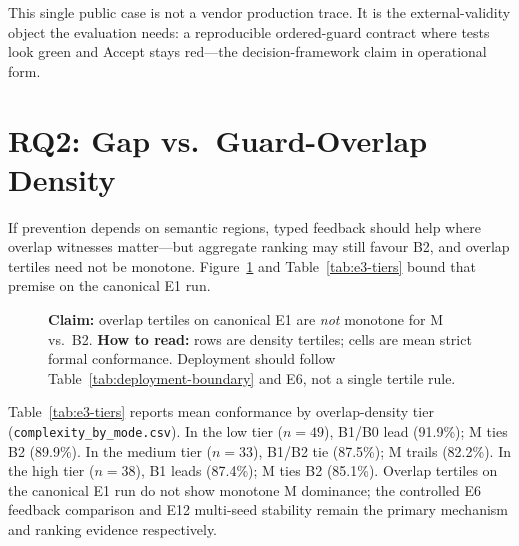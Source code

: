 This single public case is not a vendor production trace.
It is the external-validity object the evaluation needs: a reproducible
ordered-guard contract where tests look green and Accept stays red---the
decision-framework claim in operational form.



\section{RQ2: Gap vs.\ Guard-Overlap Density}
\label{sec:results:rq2}

If prevention depends on semantic regions, typed feedback should help where
overlap witnesses matter---but aggregate ranking may still favour B2, and
overlap tertiles need not be monotone.
Figure~\ref{fig:complexity} and Table~\ref{tab:e3-tiers} bound that premise
on the canonical E1 run.

\begin{figure}[t]
  \centering
  \caption{\textbf{Claim:} overlap tertiles on canonical E1 are \emph{not} monotone
    for M vs.\ B2.
    \textbf{How to read:} rows are density tertiles; cells are mean strict
    formal conformance.  Deployment should follow Table~\ref{tab:deployment-boundary}
    and E6, not a single tertile rule.}
  \label{fig:complexity}
\end{figure}

Table~\ref{tab:e3-tiers} reports mean conformance by overlap-density tier
(\texttt{complexity\_by\_mode.csv}).
In the low tier ($n{=}49$), B1/B0 lead (91.9\%); M ties B2 (89.9\%).
In the medium tier ($n{=}33$), B1/B2 tie (87.5\%); M trails (82.2\%).
In the high tier ($n{=}38$), B1 leads (87.4\%); M ties B2 (85.1\%).
Overlap tertiles on the canonical E1 run do not show monotone M dominance;
the controlled E6 feedback comparison and E12 multi-seed stability remain the
primary mechanism and ranking evidence respectively.

\begin{table}[H]
  \caption{E3: mean strict conformance by overlap-density tier (E1, $n$ per cell).}
  \label{tab:e3-tiers}
  \centering
\end{table}

